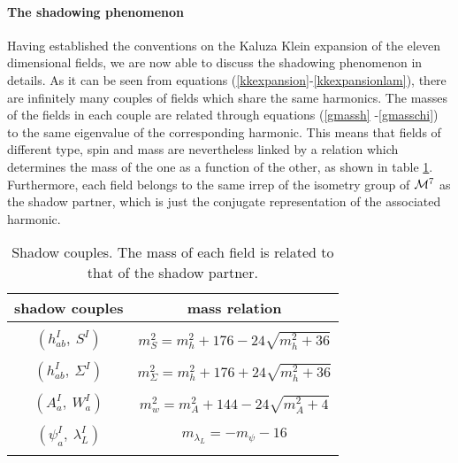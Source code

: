\documentclass[a4paper,11pt]{article}
\begin{document}
\paragraph{The shadowing phenomenon}
Having established the conventions on the Kaluza Klein expansion
of the eleven dimensional fields, we are now able to discuss the
shadowing phenomenon in details. As it can be seen from equations
(\ref{kkexpansion}-\ref{kkexpansionlam}), there are infinitely
many couples of fields which share the same harmonics. The masses
of the fields in each couple are related through equations
(\ref{gmassh} -\ref{gmasschi}) to the same eigenvalue of the
corresponding harmonic. This means that fields of different type,
spin and mass are nevertheless linked by a relation which
determines the mass of the one as a function of the other, as
shown in table \ref{shadowcouples}. Furthermore, each field
belongs to the same irrep of the isometry group of ${\cal M}^7$ as
the shadow partner, which is just the conjugate representation of
the associated harmonic.
\renewcommand{\arraystretch}{1}
\begin{table}
\begin{center}
{\small
\begin{tabular}{cc}
\hline\hline {\rm shadow couples} & {\rm mass relation}\\ \hline
\\
$(h^I_{ab},\ S^I)$ & $m^2_S=m^2_h+176-24\sqrt{m^2_h+36}$\\
\\
$(h^I_{ab},\ \Sigma^I)$ &
$m^2_\Sigma=m^2_h+176+24\sqrt{m^2_h+36}$\\
\\
$(A^I_a,\ W^I_a)$ & $m^2_w=m^2_A+144-24\sqrt{m^2_A+4}$\\
\\
$(\psi^I_a,\ \lambda^I_L)$ & $m_{\lambda_L}=-m_\psi-16$\\
\\
\hline\hline
\end{tabular}
}
\end{center}
\caption{Shadow couples. The mass of each field is related to that
of the shadow partner.} \label{shadowcouples}
\end{table}
\end{document}
